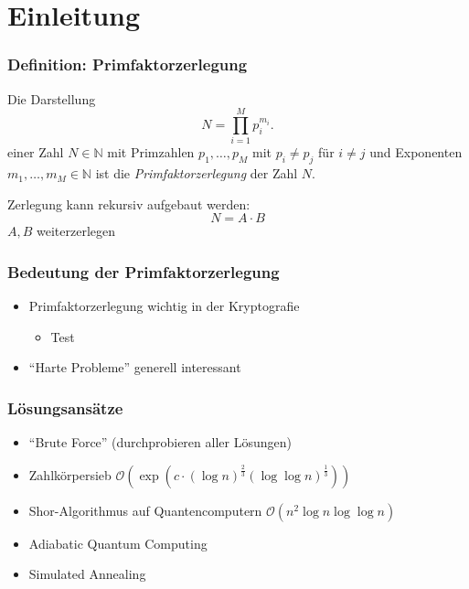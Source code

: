 \section{Einleitung}

\begin{frame}
  \frametitle{Definition: Primfaktorzerlegung}
  \begin{definition}
    Die Darstellung
    \begin{equation*}
      N=\prod\limits_{i=1}^M p_i^{m_i}.
    \end{equation*}
    einer Zahl $N\in\mathbb{N}$ mit Primzahlen $p_1,\dots,p_M$ mit $p_i \neq p_j$ für $i \neq j$ und Exponenten $m_1,\dots,m_M\in\mathbb{N}$ ist die \textit{Primfaktorzerlegung} der Zahl $N$.
  \end{definition}
  \pause{}

  Zerlegung kann rekursiv aufgebaut werden:
  \begin{equation*}
    N=A\cdot B
  \end{equation*}
  \Rightarrow{} $A, B$ weiterzerlegen
\end{frame}

\begin{frame}
  \frametitle{Bedeutung der Primfaktorzerlegung}
  \begin{itemize}
    \item Primfaktorzerlegung wichtig in der Kryptografie
    \begin{itemize}
      \item Test
    \end{itemize}
    \item ``Harte Probleme'' generell interessant
  \end{itemize}
\end{frame}

\begin{frame}
  \frametitle{Lösungsansätze}
  \begin{itemize}
    \item ``Brute Force'' (durchprobieren aller Lösungen)
    \item Zahlkörpersieb $\mathcal{O}\left(\exp\left(c\cdot {\left(\log n\right)}^{\frac{2}{3}}{\left(\log\log n\right)}^{\frac{1}{3}}\right)\right)$
    \item Shor-Algorithmus auf Quantencomputern $\mathcal{O}\left(n^2 \log n \log\log n\right)$\cite{shor}
    \item Adiabatic Quantum Computing
    \item Simulated Annealing
  \end{itemize}
\end{frame}

